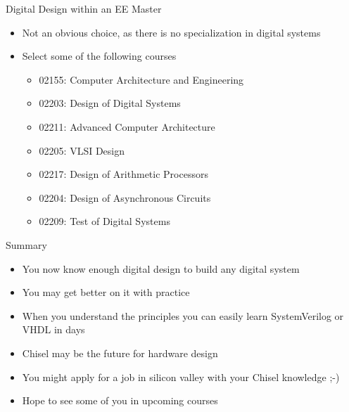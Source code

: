 \begin{frame}[fragile]{Digital Design within an EE Master}
\begin{itemize}
\item Not an obvious choice, as there is no specialization in digital systems
\item Select some of the following courses
\begin{itemize}
\item 02155: Computer Architecture and Engineering
\item 02203: Design of Digital Systems
\item 02211: Advanced Computer Architecture
\item 02205: VLSI Design
\item 02217: Design of Arithmetic Processors
\item 02204: Design of Asynchronous Circuits
\item 02209: Test of Digital Systems
\end{itemize}
\end{itemize}
\end{frame}

\begin{frame}[fragile]{Summary}
\begin{itemize}
\item You now know enough digital design to build any digital system
\item You may get better on it with practice
\item When you understand the principles you can easily learn SystemVerilog or VHDL in days
\item Chisel may be the future for hardware design
\item You might apply for a job in silicon valley with your Chisel knowledge ;-)
\item Hope to see some of you in upcoming courses
\end{itemize}
\end{frame}





